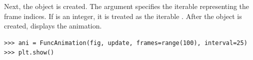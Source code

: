Next, the  object is created.
The argument  specifies the iterable representing the frame indices.
If  is an integer, it is treated as the iterable .
After the  object is created,  displays the animation.

\begin{lstlisting}
>>> ani = FuncAnimation(fig, update, frames=range(100), interval=25)
>>> plt.show()
\end{lstlisting}

